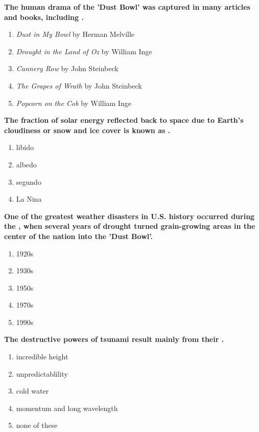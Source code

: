 \item {
\setlength{\itemsep}{0cm}
\setlength{\parskip}{.2cm}
\begin{samepage}
\textbf{
The human drama of the 'Dust Bowl' was captured in many articles and books, including \makebox[1cm]{\Rivpt\hrulefill\Rivpt}.
}
\begin{enumerate}
\item {  \emph{Dust in My Bowl} by Herman Melville  }
\item {  \emph{Drought in the Land of Oz} by William Inge }
\item {  \emph{Cannery Row} by John Steinbeck  }
\item {  \emph{The Grapes of Wrath} by John Steinbeck  }
\item {  \emph{Popcorn on the Cob} by William Inge }
\end{enumerate}
\end{samepage}
}
\item {
\setlength{\itemsep}{0cm}
\setlength{\parskip}{.2cm}
\begin{samepage}
\textbf{
The fraction of solar energy reflected back to space due to Earth's cloudiness or snow and ice cover is known as \makebox[1cm]{\Rivpt\hrulefill\Rivpt}.
}
\begin{enumerate}
\item {  libido }
\item {  albedo }
\item {  segundo }
\item {  La Nina }
\end{enumerate}
\end{samepage}
}
\item {
\setlength{\itemsep}{0cm}
\setlength{\parskip}{.2cm}
\begin{samepage}
\textbf{
One of the greatest weather disasters in U.S. history occurred during the \makebox[1cm]{\Rivpt\hrulefill\Rivpt}, when several years of drought turned grain-growing areas in the center of the nation into the 'Dust Bowl'. 
}
\begin{enumerate}
\item {  1920s }
\item {  1930s }
\item {  1950s }
\item {  1970s }
\item {  1990s }
\end{enumerate}
\end{samepage}
}
\item {
\setlength{\itemsep}{0cm}
\setlength{\parskip}{.2cm}
\begin{samepage}
\textbf{
The destructive powers of tsunami result mainly from their \makebox[1cm]{\Rivpt\hrulefill\Rivpt}.
}
\begin{enumerate}
\item { 	incredible height }
\item { 	unpredictablility }
\item { 	cold water }
\item { 	momentum and long wavelength }
\item { 	none of these 		 }
\end{enumerate}
\end{samepage}
}
